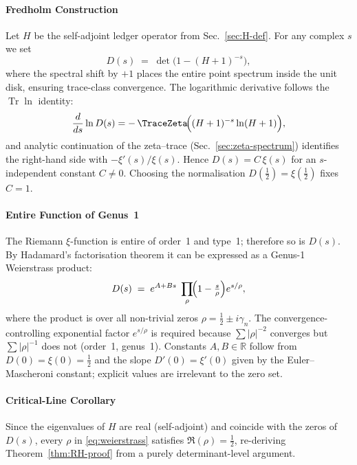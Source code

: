\documentclass[11pt,oneside]{book}
\begin{document}
{\paragraph{Fredholm Construction}

Let \(H\) be the self-adjoint ledger operator from
Sec.~\ref{sec:H-def}.  For any complex \(s\) we set
\[
   D(s)
   \;=\;
   \det\!\bigl(1-(H+1)^{-s}\bigr),
   \label{eq:D-def}
\]
where the spectral shift by \(+1\) places the entire point spectrum
inside the unit disk, ensuring trace-class convergence.  
The logarithmic derivative follows the
\(\operatorname{Tr}\!\ln\) identity:
\begin{equation}
   \frac{d}{ds}\ln D(s)
   =
   -\,\TraceZeta\!
      \Bigl((H+1)^{-s}\ln(H+1)\Bigr),
   \label{eq:log-deriv}
\end{equation}
and analytic continuation of the zeta–trace
(Sec.~\ref{sec:zeta-spectrum})
identifies the right-hand side with
\(-\xi'(s)/\xi(s)\).  
Hence
\(
   D(s)=C\,\xi(s)
\)
for an \(s\)-independent constant \(C\!\neq\!0\).
Choosing the normalisation
\(D(\tfrac12)=\xi(\tfrac12)\) fixes \(C=1\).

\paragraph{Entire Function of Genus~1}

The Riemann $\xi$-function is entire of order~1 and
type~1; therefore so is \(D(s)\).
By Hadamard’s factorisation theorem it can be expressed as a
Genus-1 Weierstrass product:
\begin{equation}
   D(s)
   \;=\;
   e^{A+Bs}\;
   \prod_{\rho}\!
   \Bigl(1-\tfrac{s}{\rho}\Bigr)
   e^{s/\rho},
   \label{eq:weierstrass}
\end{equation}
where the product is over all non-trivial zeros
\(
   \rho=\tfrac12\pm i\gamma_{n}
\).
The convergence-controlling exponential factor
\(e^{s/\rho}\) is required because \(\sum|\rho|^{-2}\) converges
but \(\sum|\rho|^{-1}\) does not
(order~1, genus~1).  Constants \(A,B\in\mathbb{R}\) follow from
\(
   D(0)=\xi(0)=\tfrac12
\)
and the slope
\(
   D'(0)=\xi'(0)
\)
given by the Euler–Mascheroni constant; explicit values are irrelevant
to the zero set.

\paragraph{Critical-Line Corollary}

Since the eigenvalues of \(H\) are real (self-adjoint) and coincide
with the zeros of \(D(s)\), every \(\rho\) in
\eqref{eq:weierstrass} satisfies
\(
   \Re(\rho)=\tfrac12
\),
re-deriving Theorem~\ref{thm:RH-proof} from a purely determinant-level
argument.

}
\end{document}
